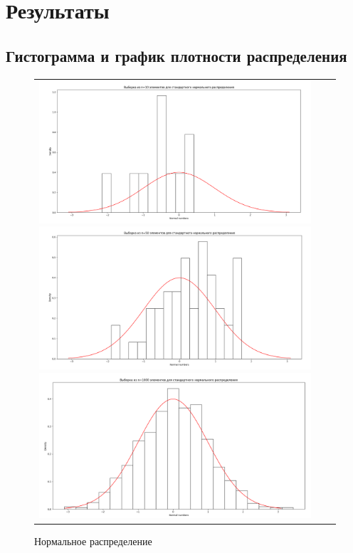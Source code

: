 \section{Результаты}

\subsection{Гистограмма и график плотности распределения}

\begin{figure}[H]
	\begin{tabular}{ccc}
		\includegraphics[scale=0.12]{resources/1_gauss_10.png}
		\includegraphics[scale=0.12]{resources/1_gauss_50.png}
		\includegraphics[scale=0.12]{resources/1_gauss_1000.png}
	\end{tabular}
	\caption{Нормальное распределение}
\end{figure}

